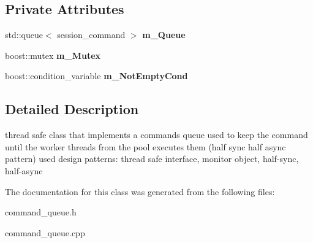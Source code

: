 \subsection*{Private Attributes}
\begin{DoxyCompactItemize}
\item 
\hypertarget{classengine_1_1cCommandQueue_a908b7233fca4a42a5a096f76ac4a17eb}{std\-::queue$<$ session\-\_\-command $>$ {\bfseries m\-\_\-\-Queue}}\label{classengine_1_1cCommandQueue_a908b7233fca4a42a5a096f76ac4a17eb}

\item 
\hypertarget{classengine_1_1cCommandQueue_a3382d012fe90188199630bef438d7901}{boost\-::mutex {\bfseries m\-\_\-\-Mutex}}\label{classengine_1_1cCommandQueue_a3382d012fe90188199630bef438d7901}

\item 
\hypertarget{classengine_1_1cCommandQueue_a7edc3ed909364aca4956ff6b8d95b912}{boost\-::condition\-\_\-variable {\bfseries m\-\_\-\-Not\-Empty\-Cond}}\label{classengine_1_1cCommandQueue_a7edc3ed909364aca4956ff6b8d95b912}

\end{DoxyCompactItemize}


\subsection{Detailed Description}
thread safe class that implements a commands queue used to keep the command until the worker threads from the pool executes them (half sync half async pattern) used design patterns\-: thread safe interface, monitor object, half-\/sync, half-\/async 

The documentation for this class was generated from the following files\-:\begin{DoxyCompactItemize}
\item 
command\-\_\-queue.\-h\item 
command\-\_\-queue.\-cpp\end{DoxyCompactItemize}
